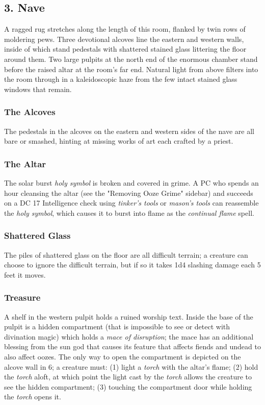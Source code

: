 \documentclass[10pt,a4paper,twoside,bg=print,twocolumn,openany,nodeprecatedcode]{dndbook}
\begin{document}
\subsection{3. Nave}
\begin{DndReadAloud}{}
A ragged rug stretches along the length of this room, flanked by twin rows of moldering pews. Three devotional alcoves line the eastern and western walls, inside of which stand pedestals with shattered stained glass littering the floor around them. Two large pulpits at the north end of the enormous chamber stand before the raised altar at the room's far end. Natural light from above filters into the room through in a kaleidoscopic haze from the few intact stained glass windows that remain.

\end{DndReadAloud}

\subsubsection{The Alcoves}
The pedestals in the alcoves on the eastern and western sides of the nave are all bare or smashed, hinting at missing works of art each crafted by a priest.

\subsubsection{The Altar}
The solar burst \textit{holy symbol} is broken and covered in grime. A PC who spends an hour cleansing the altar (see the "Removing Ooze Grime" sidebar) and succeeds on a DC 17 Intelligence check using \textit{tinker's tools} or \textit{mason's tools} can reassemble the \textit{holy symbol}, which causes it to burst into flame as the \textit{continual flame} spell.

\subsubsection{Shattered Glass}
The piles of shattered glass on the floor are all difficult terrain; a creature can choose to ignore the difficult terrain, but if so it takes 1d4 slashing damage each 5 feet it moves.

\subsubsection{Treasure}
A shelf in the western pulpit holds a ruined worship text. Inside the base of the pulpit is a hidden compartment (that is impossible to see or detect with divination magic) which holds a \textit{mace of disruption}; the mace has an additional blessing from the sun god that causes its feature that affects fiends and undead to also affect oozes. The only way to open the compartment is depicted on the alcove wall in 6; a creature must: (1) light a \textit{torch} with the altar's flame; (2) hold the \textit{torch} aloft, at which point the light cast by the \textit{torch} allows the creature to see the hidden compartment; (3) touching the compartment door while holding the \textit{torch} opens it.
\end{document}
